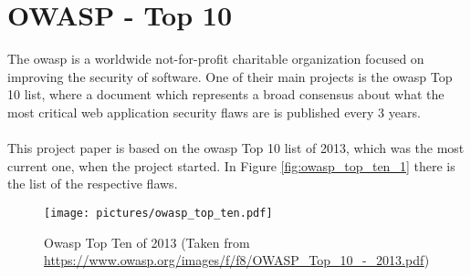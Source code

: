 \section{OWASP - Top 10}

The \gls{owasp} is a worldwide not-for-profit charitable organization focused on improving the security of software. One of their main projects is the \gls{owasp} Top 10 list, where a document which represents a broad consensus about what the most critical web application security flaws are is published every 3 years. \\
\\
This project paper is based on the \gls{owasp} Top 10 list of 2013, which was the most current one, when the project started. In Figure \ref{fig:owasp_top_ten_1} there is the list of the respective flaws.

\begin{figure}[htbp]
  \begin{center}
    \texttt{[image: pictures/owasp\_top\_ten.pdf]}
    \caption{Owasp Top Ten of 2013 (Taken from \href{https://www.owasp.org/images/f/f8/OWASP_Top_10_-_2013.pdf}{https://www.owasp.org/images/f/f8/OWASP\_Top\_10\_-\_2013.pdf})}
    \label{fig:owasp_top_ten}
  \end{center}
\end{figure}
